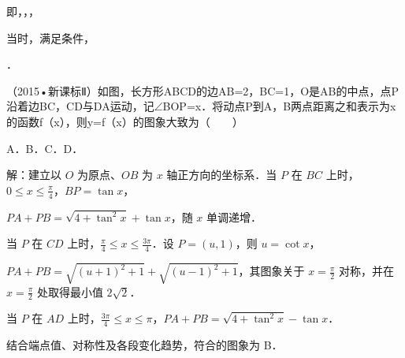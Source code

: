 \begin{question}
\begin{solution}
即，，，\par
{}当时，满足条件，\par
{}\par
{}．\par
\end{solution}
\end{question}

\begin{question}
（2015•新课标Ⅱ）如图，长方形ABCD的边AB=2，BC=1，O是AB的中点，点P沿着边BC，CD与DA运动，记\ensuremath{\angle}BOP=x．将动点P到A，B两点距离之和表示为x的函数f（x），则y=f（x）的图象大致为（　　）\par
{}\par
A．\qquad{}B．\qquad{}C．\qquad{}D．\par
\begin{solution}
解：建立以 $O$ 为原点、$OB$ 为 $x$ 轴正方向的坐标系．当 $P$ 在 $BC$ 上时，$0\leq x\leq\frac{\pi}{4}$，$BP=\tan x$，\par
$PA+PB=\sqrt{4+\tan^2x}+\tan x$，随 $x$ 单调递增．\par
当 $P$ 在 $CD$ 上时，$\frac{\pi}{4}\leq x\leq\frac{3\pi}{4}$．设 $P=(u,1)$，则 $u=\cot x$，\par
$PA+PB=\sqrt{(u+1)^2+1}+\sqrt{(u-1)^2+1}$，其图象关于 $x=\frac{\pi}{2}$ 对称，并在 $x=\frac{\pi}{2}$ 处取得最小值 $2\sqrt2$．\par
当 $P$ 在 $AD$ 上时，$\frac{3\pi}{4}\leq x\leq\pi$，$PA+PB=\sqrt{4+\tan^2x}-\tan x$．\par
结合端点值、对称性及各段变化趋势，符合的图象为 B．\par
{}\par
\end{solution}
\end{question}

